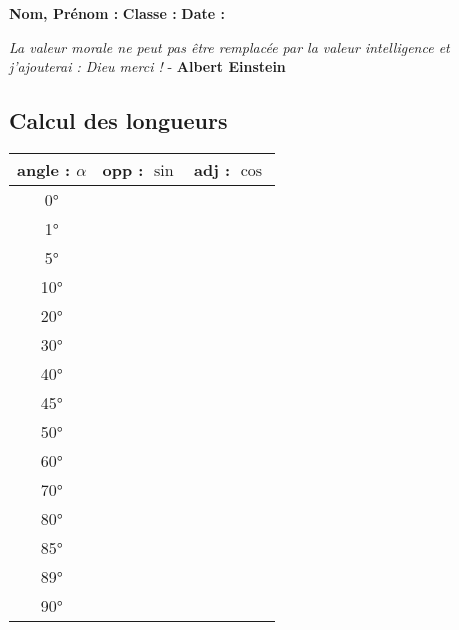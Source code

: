 



\textbf{Nom, Prénom :} \hspace{8cm} \textbf{Classe :} \hspace{3cm} \textbf{Date :}\\

\vspace{-0.5cm} \begin{center}
  \textit{La valeur morale ne peut pas être remplacée par la valeur intelligence et j'ajouterai : Dieu merci !}  - \textbf{Albert Einstein}
\end{center}


\begin{minipage}[t]{0.3\textwidth}
\subsection*{Calcul des longueurs}

\begin{center}
  \begin{tabular}{|c|c|c|}
    \hline
    angle : $\alpha$ & opp : $\sin$ & adj : $\cos$\\  \hline
       0°          &           &          \\  \hline
       1°          &           &          \\  \hline
       5°          &           &          \\  \hline
       10°         &           &          \\  \hline
       20°         &           &          \\  \hline
       30°         &           &          \\  \hline
       40°         &           &          \\  \hline
       45°         &           &          \\  \hline
       50°         &           &          \\  \hline
       60°         &           &          \\  \hline
       70°         &           &          \\  \hline
       80°         &           &          \\  \hline
       85°         &           &          \\  \hline
       89°         &           &          \\  \hline
       90°         &           &          \\  \hline
  \end{tabular}
\end{center}

\end{minipage}
